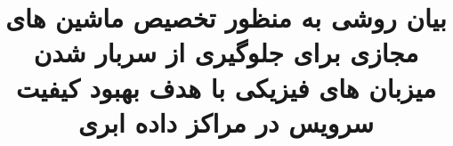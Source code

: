 \subject{مهندسی کامپیوتر}
\title{بیان روشی به منظور تخصیص ماشین های مجازی برای
	جلوگیری از سربار شدن میزبان های فیزیکی با هدف بهبود
	کیفیت سرویس در مراکز داده ابری}



\besmPage
\firstPage
\davaranPage

